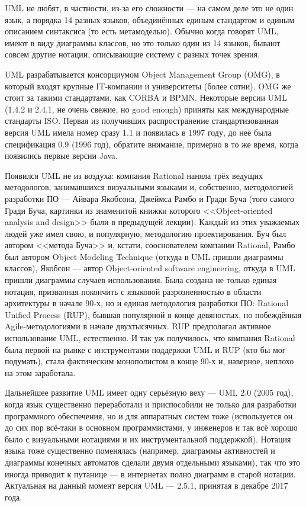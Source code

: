 \documentclass{../../text-style}
\begin{document}
UML не любят, в частности, из-за его сложности --- на самом деле это не один язык, а порядка 14 разных языков, объединённых единым стандартом и единым описанием синтаксиса (то есть метамоделью). Обычно когда говорят UML, имеют в виду диаграммы классов, но это только один из 14 языков, бывают совсем другие нотации, описывающие систему с разных точек зрения.

UML разрабатывается консорциумом Object Management Group (OMG), в который входят крупные IT-компании и университеты (более сотни). OMG же стоит за такими стандартами, как CORBA и BPMN. Некоторые версии UML (1.4.2 и 2.4.1, не очень свежие, но good enough) приняты как международные стандарты ISO. Первая из получивших распространение стандартизованная версия UML имела номер сразу 1.1 и появилась в 1997 году, до неё была спецификация 0.9 (1996 год), обратите внимание, примерно в то же время, когда появились первые версии Java. 

Появился UML не из воздуха: компания Rational наняла трёх ведущих методологов, занимавшихся визуальными языками и, собственно, методологией разработки ПО --- Айвара Якобсона, Джеймса Рамбо и Гради Буча (того самого Гради Буча, картинки из знаменитой книжки которого <<Object-oriented analysis and design>> были в предыдущей лекции). Каждый из этих уважаемых людей уже имел свою, и популярную, методологию проектирования. Буч был автором <<метода Буча>> и, кстати, сооснователем компании Rational, Рамбо был автором Object Modeling Technique (откуда в UML пришли диаграммы классов), Якобсон --- автор Object-oriented software engineering, откуда в UML пришли диаграммы случаев использования. Была создана не только единая нотация, призванная покончить с языковой разрозненностью в области архитектуры в начале 90-х, но и единая методология разработки ПО: Rational Unified Process (RUP), бывшая популярной в конце девяностых, но побеждённая Agile-методологиями в начале двухтысячных. RUP предполагал активное использование UML, естественно. И так уж получилось, что компания Rational была первой на рынке с инструментами поддержки UML и RUP (кто бы мог подумать), стала фактическим монополистом в конце 90-х и, наверное, неплохо на этом заработала.

Дальнейшее развитие UML имеет одну серьёзную веху --- UML 2.0 (2005 год), когда язык существенно переработали и приспособили не только для разработки программного обеспечения, но и для аппаратных систем тоже (используется он до сих пор всё-таки в основном программистами, у инженеров и так всё хорошо было с визуальными нотациями и их инструментальной поддержкой). Нотация языка тоже существенно поменялась (например, диаграммы активностей и диаграммы конечных автоматов сделали двумя отдельными языками), так что это иногда приводит к путанице --- в интернетах полно диаграмм в старой нотации. Актуальная на данный момент версия UML --- 2.5.1, принятая в декабре 2017 года.
\end{document}
